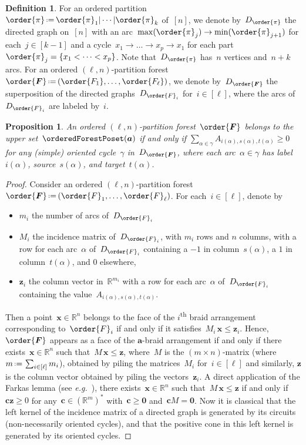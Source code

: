 \documentclass{amsart}
\newtheorem{proposition}[theorem]{Proposition}
\theoremstyle{definition}
\newtheorem{definition}[theorem]{Definition}
\newcommand{\R}{\mathbb{R}} %
\renewcommand{\b}[1]{{\boldsymbol{#1}}} %
\newcommand{\eqdef}{\mbox{\,\raisebox{0.2ex}{\scriptsize\ensuremath{\mathrm:}}\ensuremath{=}\,}} %
\newcommand{\eg}{\textit{e.g.}~} %
\newcommand{\ordinal}{\textsuperscript{th}} %
\renewcommand{\b}[1]{\boldsymbol{#1}} %
\begin{document}
\begin{definition}
For an ordered partition~$\order{\pi} \eqdef \order{\pi}_1 | \cdots | \order{\pi}_k$ of~$[n]$, we denote by~$D_{\order{\pi}}$ the directed graph on~$[n]$ with an arc~$\max(\order{\pi}_j) \to \min(\order{\pi}_{j+1})$ for each~$j \in [k-1]$ and a cycle~${x_1 \to \dots \to x_p \to x_1}$ for each part~$\order{\pi}_j = \{x_1 < \dots < x_p\}$.
Note that~$D_{\order{\pi}}$ has~$n$ vertices and~$n + k$ arcs.
For an ordered $(\ell,n)$-partition forest~$\order{\b{F}} \eqdef (\order{F_1}, \dots, \order{F_\ell})$, we denote by~$D_{\order{\b{F}}}$ the superposition of the directed graphs~$D_{\order{F}_i}$ for~$i \in [\ell]$, where the arcs of~$D_{\order{F}_i}$ are labeled by~$i$.
\end{definition}

\begin{proposition}
\label{prop:characterizationOPFs}
An ordered $(\ell,n)$-partition forest~$\order{\b{F}}$ belongs to the upper set~$\orderedForestPoset(\b{a})$ if and only if $\sum_{\alpha \in \gamma} A_{i(\alpha), s(\alpha), t(\alpha)} \ge 0$ for any (simple) oriented cycle~$\gamma$ in~$D_{\order{\b{F}}}$, where each arc~$\alpha \in \gamma$ has label~$i(\alpha)$, source~$s(\alpha)$, and target~$t(\alpha)$.
\end{proposition}

\begin{proof}
Consider an ordered $(\ell,n)$-partition forest~$\order{\b{F}} \eqdef (\order{F}_1, \dots, \order{F}_\ell)$.
For each~$i \in [\ell]$, denote by
\begin{itemize}
\item $m_i$ the number of arcs of~$D_{\order{F}_i}$
\item $M_i$ the incidence matrix of~$D_{\order{F}_i}$, with $m_i$ rows and $n$ columns, with a row for each arc~$\alpha$ of~$D_{\order{F}_i}$ containing a $-1$ in column~$s(\alpha)$, a $1$ in column~$t(\alpha)$, and $0$ elsewhere,
\item $\b{z}_i$ the column vector in~$\R^{m_i}$ with a row for each arc~$\alpha$ of~$D_{\order{F}_i}$ containing the value~$A_{i(\alpha), s(\alpha), t(\alpha)}$.
\end{itemize}
Then a point~$\b{x} \in \R^n$ belongs to the face of the $i$\ordinal{} braid arrangement corresponding to~$\order{F}_i$ if and only if it satisfies~$M_i \, \b{x} \le \b{z}_i$.
Hence, $\order{\b{F}}$ appears as a face of the $\b{a}$-braid arrangement if and only if there exists~$\b{x} \in \R^n$ such that~$M \, \b{x} \le \b{z}$, where~$M$ is the $(m \times n)$-matrix (where~$m \eqdef \sum_{i \in [\ell]} m_i$), obtained by piling the matrices~$M_i$ for~$i \in [\ell]$ and similarly, $\b{z}$ is the column vector obtained by piling the vectors~$\b{z}_i$.
A direct application of the Farkas lemma (see \eg \cite[Prop.~1.7]{Ziegler}), there exists~$\b{x} \in \R^n$ such that~$M \, \b{x} \le \b{z}$ if and only if~$\b{c} \b{z} \ge 0$ for any~$\b{c} \in (\R^m)^*$ with~$\b{c} \ge \b{0}$ and~$\b{c} M = \b{0}$.
Now it is classical that the left kernel of the incidence matrix of a directed graph is generated by its circuits (non-necessarily oriented cycles), and that the positive cone in this left kernel is generated by its oriented cycles.
\end{proof}
\end{document}
